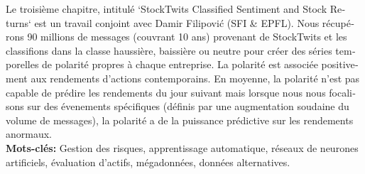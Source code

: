 \begin{otherlanguage}{french}
Le troisième chapitre, intitulé `StockTwits Classified Sentiment and Stock Returns` est un travail conjoint avec Damir Filipović (SFI \& EPFL). Nous récupérons 90 millions de messages (couvrant 10 ans) provenant de StockTwits et les classifions dans la classe haussière, baissière ou neutre pour créer des séries temporelles de polarité propres à chaque entreprise. La polarité est associée positivement aux rendements d'actions contemporains. En moyenne, la polarité n'est pas capable de prédire les rendements du jour suivant mais lorsque nous nous focalisons sur des évenements spécifiques (définis par une augmentation soudaine du volume de messages), la polarité a de la puissance prédictive sur les rendements anormaux. \\

\textbf{Mots-clés:} Gestion des risques, apprentissage automatique, réseaux de neurones artificiels, évaluation d'actifs, mégadonnées, données alternatives.

\end{otherlanguage}



